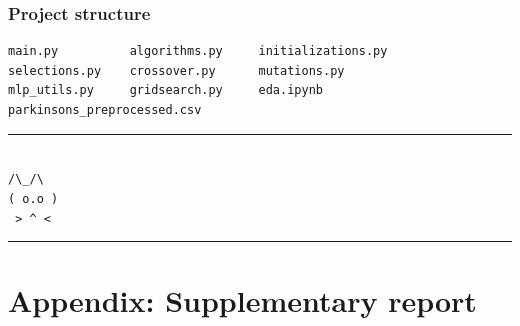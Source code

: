 \documentclass[12pt, a4paper]{article}
\begin{document}
 

\subsubsection*{Project structure}
\begin{lstlisting}
main.py          algorithms.py     initializations.py
selections.py    crossover.py      mutations.py
mlp_utils.py     gridsearch.py     eda.ipynb
parkinsons_preprocessed.csv
\end{lstlisting}

\printbibliography

\vfill
\begin{center}
  \textcolor{divider}{\rule{0.3\linewidth}{0.4pt}}\\[0.4cm]
  \texttt{\small\color{accent}/\textbackslash\_/\textbackslash}\\
  \texttt{\small\color{accent}( o.o )}\\
  \texttt{\small\color{accent}\ >\ \textasciicircum\ <}\\[0.3cm]
  \textcolor{divider}{\rule{0.3\linewidth}{0.4pt}}
\end{center}
\clearpage
\appendix
\section*{Appendix: Supplementary report}
\end{document}
